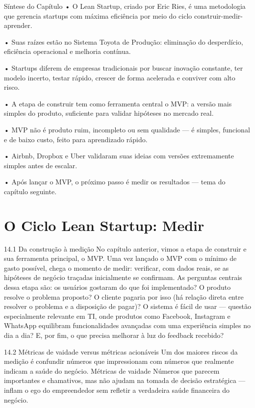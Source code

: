 Síntese do Capítulo • O Lean Startup, criado por Eric Ries, é uma metodologia que gerencia startups com máxima eficiência por meio do ciclo construir-medir-aprender.

• Suas raízes estão no Sistema Toyota de Produção: eliminação do desperdício, eficiência operacional e melhoria contínua.

• Startups diferem de empresas tradicionais por buscar inovação constante, ter modelo incerto, testar rápido, crescer de forma acelerada e conviver com alto risco.

• A etapa de construir tem como ferramenta central o MVP: a versão mais simples do produto, suficiente para validar hipóteses no mercado real.

• MVP não é produto ruim, incompleto ou sem qualidade — é simples, funcional e de baixo custo, feito para aprendizado rápido.

• Airbnb, Dropbox e Uber validaram suas ideias com versões extremamente simples antes de escalar.

• Após lançar o MVP, o próximo passo é medir os resultados — tema do capítulo seguinte.

\chapter{O Ciclo Lean Startup: Medir}

14.1 Da construção à medição No capítulo anterior, vimos a etapa de construir e sua ferramenta principal, o MVP. Uma vez lançado o MVP com o mínimo de gasto possível, chega o momento de medir: verificar, com dados reais, se as hipóteses de negócio traçadas inicialmente se confirmam. As perguntas centrais dessa etapa são: os usuários gostaram do que foi implementado? O produto resolve o problema proposto? O cliente pagaria por isso (há relação direta entre resolver o problema e a disposição de pagar)? O sistema é fácil de usar — questão especialmente relevante em TI, onde produtos como Facebook, Instagram e WhatsApp equilibram funcionalidades avançadas com uma experiência simples no dia a dia? E, por fim, o que precisa melhorar à luz do feedback recebido?

14.2 Métricas de vaidade versus métricas acionáveis Um dos maiores riscos da medição é confundir números que impressionam com números que realmente indicam a saúde do negócio. Métricas de vaidade Números que parecem importantes e chamativos, mas não ajudam na tomada de decisão estratégica — inflam o ego do empreendedor sem refletir a verdadeira saúde financeira do negócio.


